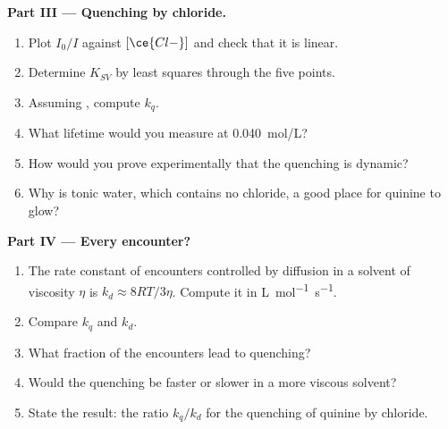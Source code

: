 \begin{problem}
\medskip\noindent\textbf{Part III --- Quenching by chloride.}
\begin{enumerate}[resume]
  \item Plot $I_0/I$ against $[\ce{Cl-}]$ and check that it is linear.
  \item Determine $K_{SV}$ by least squares through the five points.
  \item Assuming , compute $k_q$.
  \item What lifetime would you measure at \qty{0.040}{mol/L}?
  \item How would you prove experimentally that the quenching is dynamic?
  \item Why is tonic water, which contains no chloride, a good place for
        quinine to glow?
\end{enumerate}

\medskip\noindent\textbf{Part IV --- Every encounter?}
\begin{enumerate}[resume]
  \item The rate constant of encounters controlled by diffusion in a solvent of
        viscosity $\eta$ is $k_d \approx 8RT/3\eta$. Compute it in \unit{L.mol^{-1}.s^{-1}}.
  \item Compare $k_q$ and $k_d$.
  \item What fraction of the encounters lead to quenching?
  \item Would the quenching be faster or slower in a more viscous solvent?
  \item State the result: the ratio $k_q/k_d$ for the quenching of quinine by
        chloride.
\end{enumerate}
\end{problem}

